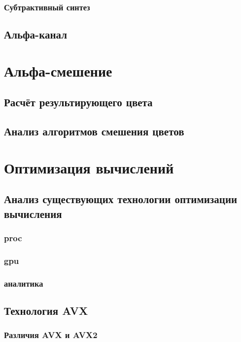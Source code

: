 \subsubsection{Субтрактивный синтез}
\subsection{Альфа-канал}

\section{Альфа-смешение}

\subsection{Расчёт результирующего цвета}

\subsection{Анализ  алгоритмов смешения цветов}
\subsection{}
\section{Оптимизация вычислений}
\subsection{Анализ существующих технологии оптимизации вычисления}
\subsubsection{proc}
\subsubsection{gpu}
\subsubsection{аналитика}
\subsection{Технология AVX}
\subsubsection{Различия AVX и AVX2}
